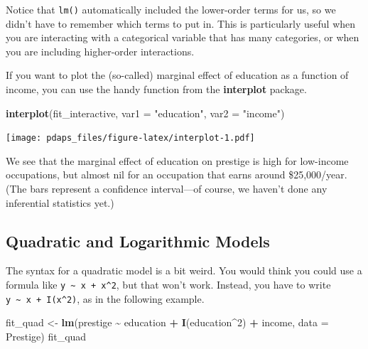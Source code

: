 \documentclass[
  12pt,
  oneside,openany]{book}
\newenvironment{Shaded}{\begin{snugshade}}{\end{snugshade}}
\newcommand{\DataTypeTok}[1]{\textcolor[rgb]{0.13,0.29,0.53}{#1}}
\newcommand{\DecValTok}[1]{\textcolor[rgb]{0.00,0.00,0.81}{#1}}
\newcommand{\KeywordTok}[1]{\textcolor[rgb]{0.13,0.29,0.53}{\textbf{#1}}}
\newcommand{\NormalTok}[1]{#1}
\newcommand{\OperatorTok}[1]{\textcolor[rgb]{0.81,0.36,0.00}{\textbf{#1}}}
\newcommand{\StringTok}[1]{\textcolor[rgb]{0.31,0.60,0.02}{#1}}
\begin{document}
Notice that \texttt{lm()} automatically included the lower-order terms for us, so we didn't have to remember which terms to put in. This is particularly useful when you are interacting with a categorical variable that has many categories, or when you are including higher-order interactions.

If you want to plot the (so-called) marginal effect of education as a function of income, you can use the handy function from the \textbf{interplot} package.

\begin{Shaded}
\begin{Highlighting}[]
\KeywordTok{interplot}\NormalTok{(fit\_interactive, }\DataTypeTok{var1 =} \StringTok{"education"}\NormalTok{, }\DataTypeTok{var2 =} \StringTok{"income"}\NormalTok{)}
\end{Highlighting}
\end{Shaded}

\texttt{[image: pdaps\_files/figure-latex/interplot-1.pdf]}

We see that the marginal effect of education on prestige is high for low-income occupations, but almost nil for an occupation that earns around \$25,000/year. (The bars represent a confidence interval---of course, we haven't done any inferential statistics yet.)

\hypertarget{quadratic-and-logarithmic-models}{%
\subsection{Quadratic and Logarithmic Models}\label{quadratic-and-logarithmic-models}}

The syntax for a quadratic model is a bit weird. You would think you could use a formula like \texttt{y\ \textasciitilde{}\ x\ +\ x\^{}2}, but that won't work. Instead, you have to write \texttt{y\ \textasciitilde{}\ x\ +\ I(x\^{}2)}, as in the following example.

\begin{Shaded}
\begin{Highlighting}[]
\NormalTok{fit\_quad \textless{}{-}}\StringTok{ }\KeywordTok{lm}\NormalTok{(prestige }\OperatorTok{\textasciitilde{}}\StringTok{ }\NormalTok{education }\OperatorTok{+}\StringTok{ }\KeywordTok{I}\NormalTok{(education}\OperatorTok{\^{}}\DecValTok{2}\NormalTok{) }\OperatorTok{+}\StringTok{ }\NormalTok{income, }\DataTypeTok{data =}\NormalTok{ Prestige)}
\NormalTok{fit\_quad}
\end{Highlighting}
\end{Shaded}
\end{document}
